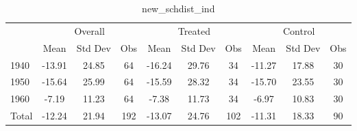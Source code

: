\begin{table}[htbp]\centering
\def\sym#1{\ifmmode^{#1}\else\(^{#1}\)\fi}
\caption{new\_schdist\_ind \label{tab1}}
\begin{tabular}{l*{3}{ccc}}
\toprule
                    &\multicolumn{3}{c}{Overall}           &\multicolumn{3}{c}{Treated}           &\multicolumn{3}{c}{Control}           \\
                    &        Mean&     Std Dev&         Obs&        Mean&     Std Dev&         Obs&        Mean&     Std Dev&         Obs\\
\midrule
1940                &      -13.91&       24.85&          64&      -16.24&       29.76&          34&      -11.27&       17.88&          30\\
1950                &      -15.64&       25.99&          64&      -15.59&       28.32&          34&      -15.70&       23.55&          30\\
1960                &       -7.19&       11.23&          64&       -7.38&       11.73&          34&       -6.97&       10.83&          30\\
Total               &      -12.24&       21.94&         192&      -13.07&       24.76&         102&      -11.31&       18.33&          90\\
\bottomrule
\end{tabular}
\end{table}
